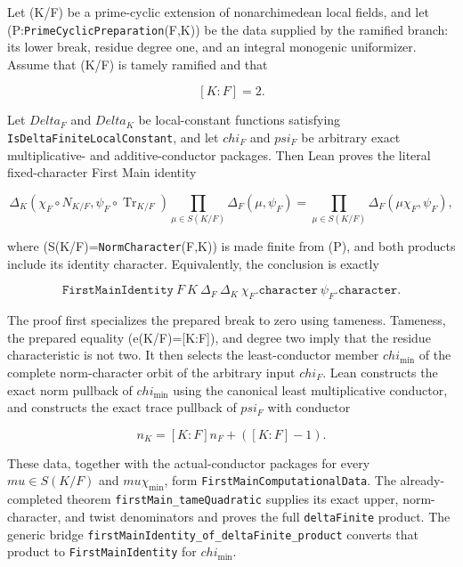 \begin{theorem}
\label{mod:cases-tamequadraticpreparation}
Let (K/F) be a prime-cyclic extension of nonarchimedean local fields, and
let (P:\texttt{PrimeCyclicPreparation}(F,K)) be the data supplied by the
ramified branch: its lower break, residue degree one, and an integral
monogenic uniformizer.  Assume that (K/F) is tamely ramified and that

\[
 [K:F]=2.
\]

Let \(Delta_F\) and \(Delta_K\) be local-constant functions satisfying
\texttt{IsDeltaFiniteLocalConstant}, and let \(chi_F\) and \(psi_F\) be
arbitrary exact multiplicative- and additive-conductor packages.  Then Lean
proves the literal fixed-character First Main identity

\[
 \Delta_K(\chi_F\circ N_{K/F},
          \psi_F\circ\operatorname{Tr}_{K/F})
 \prod_{\mu\in S(K/F)}\Delta_F(\mu,\psi_F)
 =
 \prod_{\mu\in S(K/F)}\Delta_F(\mu\chi_F,\psi_F),
\]

where (S(K/F)=\texttt{NormCharacter}(F,K)) is made finite from (P), and
both products include its identity character.  Equivalently, the conclusion
is exactly

\[
 \texttt{FirstMainIdentity}\ F\ K\ \Delta_F\ \Delta_K\
   \chi_F.\texttt{character}\ \psi_F.\texttt{character}.
\]

The proof first specializes the prepared break to zero using tameness.
Tameness, the prepared equality (e(K/F)=[K:F]), and degree two imply that
the residue characteristic is not two.  It then selects the
least-conductor member \(chi_{\min}\) of the complete norm-character orbit
of the arbitrary input \(chi_F\).  Lean constructs the exact norm pullback
of \(chi_{\min}\) using the canonical least multiplicative conductor, and
constructs the exact trace pullback of \(psi_F\) with conductor

\[
 n_K=[K:F]n_F+([K:F]-1).
\]

These data, together with the actual-conductor packages for every
\(mu\in S(K/F)\) and \(mu\chi_{\min}\), form
\texttt{FirstMainComputationalData}.  The already-completed theorem
\texttt{firstMain\_tameQuadratic} supplies its exact upper, norm-character,
and twist denominators and proves the full \texttt{deltaFinite} product.
The generic bridge
\texttt{firstMainIdentity\_of\_deltaFinite\_product} converts that product
to \texttt{FirstMainIdentity} for \(chi_{\min}\).


\end{theorem}
